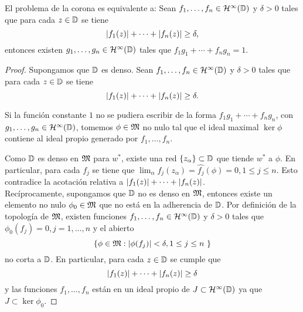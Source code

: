 \begin{theorem}
    El problema de la corona es equivalente a:
     Sean $f_1, \dots, f_n \in \mathcal{H}^{\infty}(\mathbb{D})$ y $\delta > 0$ tales que para cada $z \in \mathbb{D}$ se tiene
\begin{equation*}
    \left\lvert f_1(z)\right\rvert + \cdots + \left\lvert f_n(z)\right\rvert \geq \delta,
\end{equation*}
     entonces existen $g_1, \dots, g_n \in \mathcal{H}^{\infty}(\mathbb{D})$ tales que $f_1 g_1 + \cdots + f_n g_n = 1$.

\end{theorem}

\begin{proof}
Supongamos que $\mathbb{D}$ es denso. Sean $f_1, \dots, f_n \in \mathcal{H}^{\infty}(\mathbb{D})$ y $\delta > 0$ tales que para cada $z \in \mathbb{D}$ se tiene
\begin{equation*}
    \left\lvert f_1(z)\right\rvert + \cdots + \left\lvert f_n(z)\right\rvert \geq \delta.
\end{equation*}

Si la función constante $1$ no se pudiera escribir de la forma $f_1 g_1 + \cdots + f_n g_n$, con $g_1, \dots, g_n \in \mathcal{H}^{\infty}(\mathbb{D})$, tomemos $\phi \in \mathfrak{M}$ no nulo tal que el ideal maximal $\ker \phi$ contiene al ideal propio generado por $f_1, \dots, f_n$.

Como $\mathbb{D}$ es denso en $\mathfrak{M}$ para $w^*$, existe una red $\{z_\alpha \} \subset \mathbb{D}$ que tiende $w^*$ a $\phi$. En particular, para cada $f_j$ se tiene que $\lim_\alpha f_j (z_\alpha) = \widehat{f_j} (\phi) = 0, 1 \leq j \leq n$. Esto contradice la acotación relativa a $\left\lvert f_1(z)\right\rvert + \cdots + \left\lvert f_n(z)\right\rvert$. \\

Recíprocamente, supongamos que $\mathbb{D}$ no es denso en $\mathfrak{M}$, entonces existe un elemento no nulo $\phi_0 \in \mathfrak{M}$ que no está en la adherencia de $\mathbb{D}$. Por definición de la topología de $\mathfrak{M}$, existen funciones $f_1, \dots, f_n \in \mathcal{H}^{\infty}(\mathbb{D})$ y $\delta > 0$ tales que $\phi_0 (f_j) = 0, j = 1, \dots, n$ y el abierto
\begin{equation*}
    \{ \phi \in \fiber : \abs{\phi (f_j)} < \delta, 1 \leq j \leq n \}
\end{equation*}
no corta a $\mathbb{D}$. En particular, para cada $z \in \mathbb{D}$ se cumple que
\begin{equation*}
    \left\lvert f_1(z)\right\rvert + \cdots + \left\lvert f_n(z)\right\rvert \geq \delta
\end{equation*}
y las funciones $f_1, \dots, f_n$ están en un ideal propio de $J \subset \mathcal{H}^{\infty}(\mathbb{D})$ ya que $J \subset \ker \phi_0$. %


\end{proof}
